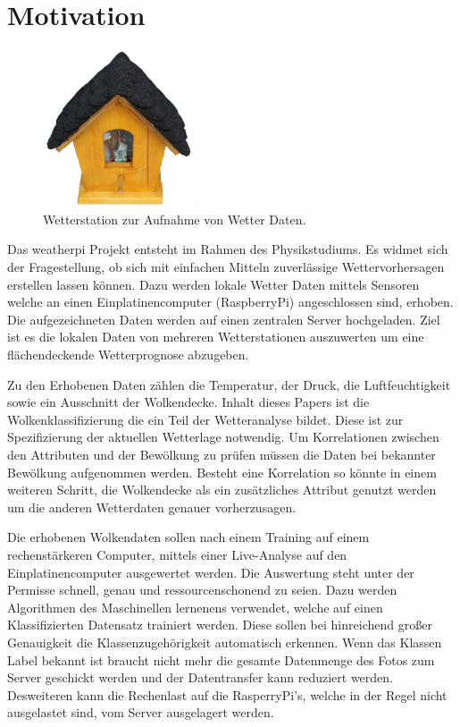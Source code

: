 \section{Motivation}
\label{sec:Motivation}

\begin{figure}
		\vspace{-0.9cm}
		\centering
		\includegraphics[width=0.4\textwidth]{./pictures/wetterstation.pdf}
		\caption{Wetterstation zur Aufnahme von Wetter Daten.}
		\label{fig:name}
		\vspace{-0.5cm}
\end{figure}
Das weatherpi Projekt entsteht im Rahmen des Physikstudiums.
Es widmet sich der Fragestellung, ob sich mit einfachen Mitteln zuverlässige
Wettervorhersagen erstellen lassen können.
Dazu werden lokale Wetter Daten mittels Sensoren welche an einen 
Einplatinencomputer (RaspberryPi) angeschlossen sind, erhoben.
Die aufgezeichneten Daten werden auf einen zentralen Server hochgeladen.
Ziel ist es die lokalen Daten von mehreren Wetterstationen auszuwerten um eine
flächendeckende Wetterprognose abzugeben. 

Zu den Erhobenen Daten zählen die Temperatur, der Druck, die Luftfeuchtigkeit
sowie ein Ausschnitt der Wolkendecke.
Inhalt dieses Papers ist die Wolkenklassifizierung die ein Teil der
Wetteranalyse bildet.
Diese ist zur Spezifizierung der aktuellen Wetterlage notwendig.
Um Korrelationen zwischen den Attributen und der Bewölkung zu prüfen
müssen die Daten bei bekannter Bewölkung aufgenommen werden.
Besteht eine Korrelation so könnte in einem weiteren Schritt, die Wolkendecke
als ein zusätzliches Attribut genutzt werden um die anderen Wetterdaten genauer
vorherzusagen. 

Die erhobenen Wolkendaten sollen nach einem Training auf einem rechenstärkeren
Computer, mittels einer Live-Analyse auf den Einplatinencomputer ausgewertet 
werden.
Die Auswertung steht unter der Permisse schnell, genau und ressourcenschonend 
zu seien.
Dazu werden Algorithmen des Maschinellen lernenens verwendet, welche auf einen
Klassifizierten Datensatz trainiert werden. 
Diese sollen bei hinreichend großer Genauigkeit die Klassenzugehörigkeit
automatisch erkennen.
Wenn das Klassen Label bekannt ist braucht nicht mehr die gesamte Datenmenge des
Fotos zum Server geschickt werden und der Datentransfer kann reduziert werden. 
Desweiteren kann die Rechenlast auf die RasperryPi's, welche in der Regel 
nicht ausgelastet sind, vom Server ausgelagert werden. 

